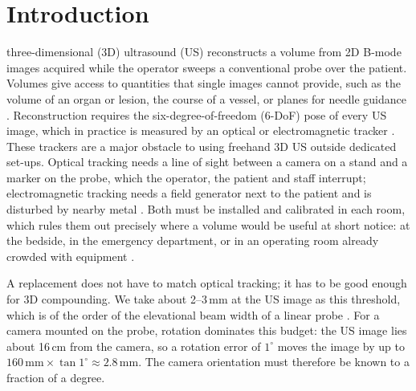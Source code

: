 \documentclass[journal]{IEEEtran}
\begin{document}
\section{Introduction}
\label{sec:intro}

 three-dimensional (3D) ultrasound (US) reconstructs a volume from 2D B-mode images acquired while the operator sweeps a conventional probe over the patient. Volumes give access to quantities that single images cannot provide, such as the volume of an organ or lesion, the course of a vessel, or planes for needle guidance \cite{TODO-3dus-clinical-applications}. Reconstruction requires the six-degree-of-freedom (6-DoF) pose of every US image, which in practice is measured by an optical or electromagnetic tracker \cite{TODO-freehand-3dus-review}. These trackers are a major obstacle to using freehand 3D US outside dedicated set-ups. Optical tracking needs a line of sight between a camera on a stand and a marker on the probe, which the operator, the patient and staff interrupt; electromagnetic tracking needs a field generator next to the patient and is disturbed by nearby metal \cite{TODO-em-tracking-distortion}. Both must be installed and calibrated in each room, which rules them out precisely where a volume would be useful at short notice: at the bedside, in the emergency department, or in an operating room already crowded with equipment \cite{TODO-point-of-care-3dus}.

A replacement does not have to match optical tracking; it has to be good enough for 3D compounding. We take about 2--3\,mm at the US image as this threshold, which is of the order of the elevational beam width of a linear probe \cite{TODO-elevational-beamwidth}. For a camera mounted on the probe, rotation dominates this budget: the US image lies about 16\,cm from the camera, so a rotation error of $1^\circ$ moves the image by up to $160\,\mathrm{mm}\times\tan 1^\circ\approx2.8$\,mm. The camera orientation must therefore be known to a fraction of a degree.
\end{document}
